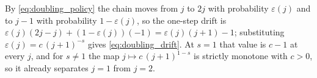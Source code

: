 By \eqref{eq:doubling_policy} the chain moves from $j$ to $2j$ with probability
$\varepsilon(j)$ and to $j-1$ with probability $1-\varepsilon(j)$, so the one-step drift is
$\varepsilon(j)(2j-j)+(1-\varepsilon(j))(-1)=\varepsilon(j)(j+1)-1$; substituting
$\varepsilon(j)=c\,(j+1)^{-s}$ gives \eqref{eq:doubling_drift}. At $s=1$ that value is $c-1$
at every $j$, and for $s\neq1$ the map $j\mapsto c\,(j+1)^{1-s}$ is strictly monotone with
$c>0$, so it already separates $j=1$ from $j=2$.
